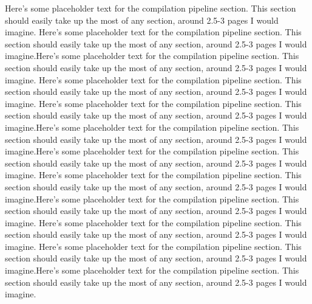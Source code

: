 \documentclass[preprint]{sigplanconf}
\begin{document}
Here's some placeholder text for the compilation pipeline section.  This
section should easily take up the most of any section, around 2.5-3 pages I
would imagine.
Here's some placeholder text for the compilation pipeline section.  This
section should easily take up the most of any section, around 2.5-3 pages I
would imagine.Here's some placeholder text for the compilation pipeline section.
 This
section should easily take up the most of any section, around 2.5-3 pages I
would imagine.
Here's some placeholder text for the compilation pipeline section.  This
section should easily take up the most of any section, around 2.5-3 pages I
would imagine.
Here's some placeholder text for the compilation pipeline section.  This
section should easily take up the most of any section, around 2.5-3 pages I
would imagine.Here's some placeholder text for the compilation pipeline section.
 This
section should easily take up the most of any section, around 2.5-3 pages I
would imagine.Here's some placeholder text for the compilation pipeline section.
 This
section should easily take up the most of any section, around 2.5-3 pages I
would imagine.
Here's some placeholder text for the compilation pipeline section.  This
section should easily take up the most of any section, around 2.5-3 pages I
would imagine.Here's some placeholder text for the compilation pipeline section.
 This
section should easily take up the most of any section, around 2.5-3 pages I
would imagine.
Here's some placeholder text for the compilation pipeline section.  This
section should easily take up the most of any section, around 2.5-3 pages I
would imagine.
Here's some placeholder text for the compilation pipeline section.  This
section should easily take up the most of any section, around 2.5-3 pages I
would imagine.Here's some placeholder text for the compilation pipeline section.
 This
section should easily take up the most of any section, around 2.5-3 pages I
would imagine.
\end{document}
